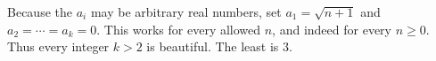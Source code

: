 Because the $a_i$ may be arbitrary real numbers, set $a_1=\sqrt{n+1}$ and $a_2=\cdots=a_k=0$. This works for every allowed $n$, and indeed for every $n\ge0$. Thus every integer $k>2$ is beautiful. The least is $\boxed3$.
